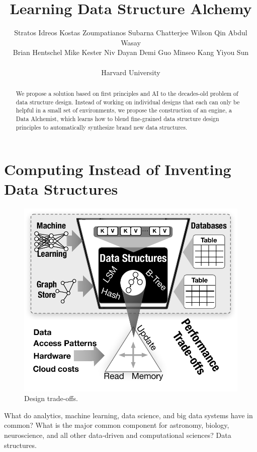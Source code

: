 \documentclass[11pt]{article}
\begin{document}
\title{Learning Data Structure Alchemy}

\author{
Stratos Idreos\quad
Kostas Zoumpatianos\quad
Subarna Chatterjee\quad
Wilson Qin\quad
Abdul Wasay\quad\\
Brian Hentschel\quad
Mike Kester\quad
Niv Dayan\quad
Demi Guo\quad
Minseo Kang\quad
Yiyou Sun\\\\
Harvard University
} 

 \maketitle 


 \begin{abstract}
 We propose a solution based on first principles and AI to the decades-old problem of data structure design. Instead of working on individual designs that each can only be helpful in a small set of environments, we propose the construction of an engine, a Data Alchemist, which learns how to blend fine-grained data structure design principles to automatically synthesize brand new data structures.
 \end{abstract}

\section{Computing Instead of Inventing Data Structures}

\begin{figure}
\center
\vspace{-2.5em}
\includegraphics[width=.4\textwidth]{figs/IntroFigure.pdf}
\vspace{-3em}
\caption{Design trade-offs.}
\label{fig:rum}
\end{figure}What do analytics, machine learning, data science, and big data systems have in common? What is the major common component for astronomy, biology, neuroscience, and all other data-driven and computational sciences? Data structures. 
\end{document}
